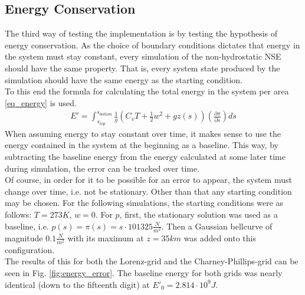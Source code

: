 \subsection{Energy Conservation}\label{sec:energy_conservation_test}
The third way of testing the implementation is by testing the hypothesis of energy conservation.
As the choice of boundary conditions dictates that energy in the system must stay constant, every simulation of the non-hydrostatic NSE should have the same property.
That is, every system state produced by the simulation should have the same energy as the starting condition.\\
To this end the formula for calculating the total energy in the system per area \ref{eq_energy} is used.
\begin{align*}
E'=\int_{s_{top}}^{s_{bottom}} \frac{1}{g}(C_vT+\frac{1}{2}w^2 + gz(s)) \left( \frac{\partial \pi}{\partial s} \right) ds
\end{align*}
When assuming energy to stay constant over time, it makes sense to use the energy contained in the system at the beginning as a baseline.
This way, by subtracting the baseline energy from the energy calculated at some later time during simulation, the error can be tracked over time.\\
Of course, in order for it to be possible for an error to appear, the system must change over time, i.e. not be stationary.
Other than that any starting condition may be chosen.
For the following simulations, the starting conditions were as follows: $T=273K$, $w=0$.
For $p$, first, the stationary solution was used as a baseline, i.e. $p(s)=\pi (s)=s\cdot 101325\frac{N}{m^2}$.
Then a Gaussian bellcurve of magnitude $0.1\frac{N}{m^2}$ with its maximum at $z=35km$ was added onto this configuration.
\\
The results of this for both the Lorenz-grid and the Charney-Phillips-grid can be seen in Fig. \ref{fig:energy_error}.
The baseline energy for both grids was nearly identical (down to the fifteenth digit) at $E'_0=2.814\cdot 10^9J$. %

